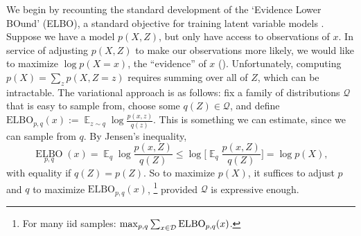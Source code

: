\documentclass[twoside]{article}
\theoremstyle{plain}
\theoremstyle{definition}
\DeclareMathOperator*{\Ex}{\mathbb{E}} %
\newcommand{\thickD}{I\mkern-8muD}
\newcommand{\kldiv}{\thickD\infdivx}
\begin{document}
We begin by recounting the standard development of the `Evidence Lower BOund' (ELBO), a standard objective for training latent variable models \parencite[\S2.2]{blei2017variational}.
%
Suppose we have a model $p(X,Z)$, but only have access to observations of $x$.
In service of adjusting $p(X,Z)$ to make our observations more likely, we would like to maximize $\log p(X\!\!=\!x)$, the ``evidence'' of $x$ ().
Unfortunately, computing $p(X) = \sum_z p(X,Z\!\!=\!z)$ requires summing over all of $Z$, which can be intractable.
%
The variational approach is as follows: fix a family of distributions $\mathcal Q$ that is easy to sample from, choose some $q(Z) \in \mathcal Q$, and define
$\mathrm{ELBO}_{p,q}(x) := \Ex_{z \sim q} \log \frac{p(x,z)}{q(z)}$.
This is something we can estimate, since we can sample from $q$. By Jensen's inequality,
\[
    \mathop{\mathrm{ELBO}}\limits_{p,q}(x)
    =\! \Ex_{q} \log \frac{p(x,Z)}{q(Z)}
    \le  \log \Big[\! \Ex_{q}\! \frac{p(x,Z)}{q(Z)} \Big]\!
    = \log p(X),
\]
with equality if $q(Z) = p(Z)$.
So to maximize $p(X)$, it suffices to adjust $p$ and $q$ to maximize $\mathrm{ELBO}_{p,q}(x)$,%
    \footnote{For many iid samples: $\max_{p,q}\sum_{x \in {\mathcal D}}\mathrm{ELBO}_{p,q}(x)$.}
 provided $\mathcal Q$ is expressive enough.
\end{document}

